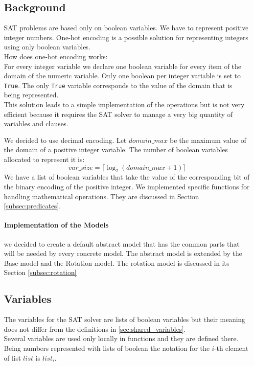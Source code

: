 \subsection{Background}\label{subsec:background}
  SAT problems are based only on boolean variables. We have to represent positive integer numbers. 
  One-hot encoding is a possible solution for representing integers using only boolean variables.\\
  How does one-hot encoding works:\\
  For every integer variable we declare one boolean variable for every item of the domain of 
  the numeric variable. Only one boolean per integer variable is set to \texttt{True}. The only \texttt{True} 
  variable corresponds to the value of the domain that is being represented.\\
  This solution leads to a simple implementation of the operations but is not very efficient 
  because it requires the SAT solver to manage a very big quantity of variables and clauses.

  We decided to use decimal encoding. Let $domain\_max$ be the maximum value of the domain of 
  a positive integer variable. The number of boolean variables allocated to represent it is:
  \begin{equation}
      var\_size = \lceil \log_2 (domain\_max + 1)\rceil
  \end{equation}
  We have a list of boolean variables that take the value of the corresponding bit of the binary encoding
  of the positive integer. We implemented specific functions for handling mathematical operations.
  They are discussed in Section \ref{subsec:predicates}. \\

  \paragraph*{Implementation of the Models}
  we decided to create a default abstract model that has the common parts that will be needed by
  every concrete model. The abstract model is extended by the Base model and the Rotation model. 
  The rotation model is discussed in its Section \ref{subsec:rotation}


\subsection{Variables}\label{subsec:variables}
  The variables for the SAT solver are lists of boolean variables but their meaning does not differ from the 
  definitions in \ref{sec:shared_variables}.\\
  Several variables are used only locally in functions and they are defined there.\\
  Being numbers represented with lists of boolean the notation for the $i$-th element of list 
  $list$ is $list_i$.

